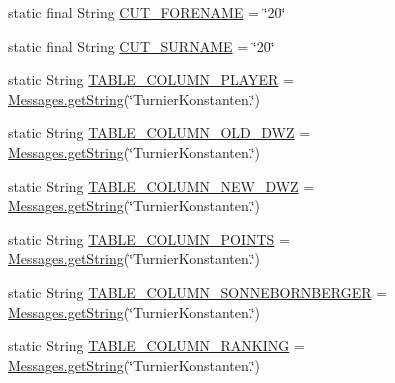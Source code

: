 \begin{DoxyCompactItemize}
\item 
static final String \hyperlink{classde_1_1turnierverwaltung_1_1model_1_1_tournament_constants_af1dbebb1de85d1b11981a443a5818728}{C\+U\+T\+\_\+\+F\+O\+R\+E\+N\+A\+ME} = \char`\"{}20\char`\"{}
\item 
static final String \hyperlink{classde_1_1turnierverwaltung_1_1model_1_1_tournament_constants_a447e8d1dee7fa5736347ce54028b8038}{C\+U\+T\+\_\+\+S\+U\+R\+N\+A\+ME} = \char`\"{}20\char`\"{}
\item 
static String \hyperlink{classde_1_1turnierverwaltung_1_1model_1_1_tournament_constants_a34b76bc1b1b74932cb16f583fd5324f6}{T\+A\+B\+L\+E\+\_\+\+C\+O\+L\+U\+M\+N\+\_\+\+P\+L\+A\+Y\+ER} = \hyperlink{classde_1_1turnierverwaltung_1_1model_1_1_messages_aa5a2a96b8a7e711b94954e273f603b68}{Messages.\+get\+String}(\char`\"{}Turnier\+Konstanten.\char`\"{})
\item 
static String \hyperlink{classde_1_1turnierverwaltung_1_1model_1_1_tournament_constants_a746a57e4e19de54515427ddb3fb1622c}{T\+A\+B\+L\+E\+\_\+\+C\+O\+L\+U\+M\+N\+\_\+\+O\+L\+D\+\_\+\+D\+WZ} = \hyperlink{classde_1_1turnierverwaltung_1_1model_1_1_messages_aa5a2a96b8a7e711b94954e273f603b68}{Messages.\+get\+String}(\char`\"{}Turnier\+Konstanten.\char`\"{})
\item 
static String \hyperlink{classde_1_1turnierverwaltung_1_1model_1_1_tournament_constants_ad37873f08c986719a93688d10ea330c6}{T\+A\+B\+L\+E\+\_\+\+C\+O\+L\+U\+M\+N\+\_\+\+N\+E\+W\+\_\+\+D\+WZ} = \hyperlink{classde_1_1turnierverwaltung_1_1model_1_1_messages_aa5a2a96b8a7e711b94954e273f603b68}{Messages.\+get\+String}(\char`\"{}Turnier\+Konstanten.\char`\"{})
\item 
static String \hyperlink{classde_1_1turnierverwaltung_1_1model_1_1_tournament_constants_add7d92f4e36d2760d6f7cf5fc73d0c9a}{T\+A\+B\+L\+E\+\_\+\+C\+O\+L\+U\+M\+N\+\_\+\+P\+O\+I\+N\+TS} = \hyperlink{classde_1_1turnierverwaltung_1_1model_1_1_messages_aa5a2a96b8a7e711b94954e273f603b68}{Messages.\+get\+String}(\char`\"{}Turnier\+Konstanten.\char`\"{})
\item 
static String \hyperlink{classde_1_1turnierverwaltung_1_1model_1_1_tournament_constants_a5aec5c48e076bb763cb93cfb736bb448}{T\+A\+B\+L\+E\+\_\+\+C\+O\+L\+U\+M\+N\+\_\+\+S\+O\+N\+N\+E\+B\+O\+R\+N\+B\+E\+R\+G\+ER} = \hyperlink{classde_1_1turnierverwaltung_1_1model_1_1_messages_aa5a2a96b8a7e711b94954e273f603b68}{Messages.\+get\+String}(\char`\"{}Turnier\+Konstanten.\char`\"{})
\item 
static String \hyperlink{classde_1_1turnierverwaltung_1_1model_1_1_tournament_constants_ad04558dca8d9569390bef081ed2d9cbd}{T\+A\+B\+L\+E\+\_\+\+C\+O\+L\+U\+M\+N\+\_\+\+R\+A\+N\+K\+I\+NG} = \hyperlink{classde_1_1turnierverwaltung_1_1model_1_1_messages_aa5a2a96b8a7e711b94954e273f603b68}{Messages.\+get\+String}(\char`\"{}Turnier\+Konstanten.\char`\"{})

\end{DoxyCompactItemize}
